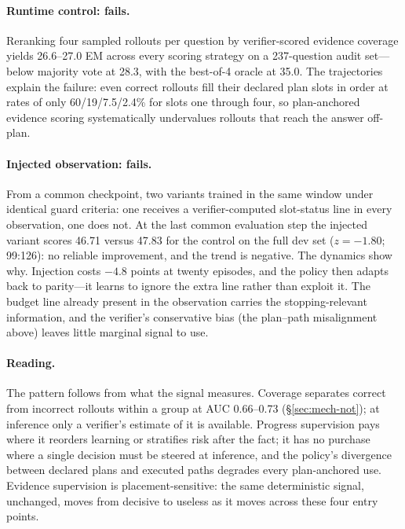 \paragraph{Runtime control: fails.} Reranking four sampled rollouts
per question by verifier-scored evidence coverage yields 26.6--27.0
EM across every scoring strategy on a 237-question audit
set---below majority vote at 28.3, with the best-of-4 oracle at
35.0. The trajectories explain the failure: even correct rollouts
fill their declared plan slots in order at rates of only
60/19/7.5/2.4\% for slots one through four, so plan-anchored
evidence scoring systematically undervalues rollouts that reach the
answer off-plan.

\paragraph{Injected observation: fails.} From a common checkpoint,
two variants trained in the same window under identical guard criteria:
one receives a verifier-computed slot-status line in every
observation, one does not. At the last common evaluation step the
injected variant scores 46.71 versus 47.83 for the control on the full
dev set ($z=-1.80$; 99:126): no reliable improvement, and the trend
is negative. The dynamics show why. Injection costs $-4.8$ points at
twenty episodes, and the policy then adapts back to parity---it
learns to ignore the extra line rather than exploit it. The budget
line already present in the observation carries the
stopping-relevant information, and the verifier's conservative bias
(the plan--path misalignment above) leaves little marginal signal to
use.

\paragraph{Reading.} The pattern follows from what the signal
measures. Coverage separates correct from incorrect rollouts within a
group at AUC 0.66--0.73 (\S\ref{sec:mech-not}); at inference only a
verifier's estimate of it is available. Progress supervision pays where
it reorders learning or stratifies risk after the fact; it has no
purchase where a single decision must be steered at inference, and
the policy's divergence between declared plans and executed paths
degrades every plan-anchored use. Evidence supervision is
placement-sensitive: the same deterministic signal, unchanged, moves
from decisive to useless as it moves across these four entry points.
